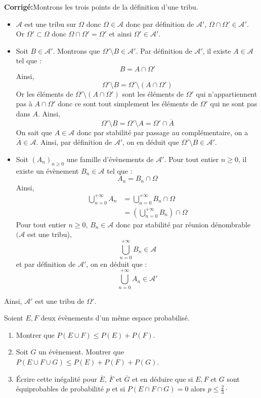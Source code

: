 \documentclass[a4paper,twoside,french,10pt]{VcCours}
\newcommand{\corr}{\textbf{Corrigé:}}
\begin{document}
\corr Montrons les trois points de la définition d'une tribu.

\begin{itemize}
\item $\mathcal{A}$ est une tribu sur $\Omega$ donc $\Omega \in \mathcal{A}$ donc par définition de $\mathcal{A}'$, $ \Omega \cap \Omega' \in \mathcal{A}'$. Or $\Omega' \subset \Omega$ donc $ \Omega \cap \Omega' = \Omega'$ et ainsi $\Omega' \in \mathcal{A}'$.
\item Soit $B \in \mathcal{A}'$. Montrons que $\Omega' \setminus B \in \mathcal{A}'$. Par définition de $\mathcal{A}'$, il existe $A \in \mathcal{A}$ tel que :
$$ B = A \cap \Omega'$$
Ainsi,
$$ \Omega' \setminus B  = \Omega' \setminus  (A \cap \Omega') $$
Or les éléments de $\Omega' \setminus  (A \cap \Omega')$ sont les éléments de $\Omega'$ qui n'appartiennent pas à $A \cap \Omega'$ donc ce sont tout simplement les éléments de $\Omega'$ qui ne sont pas dans $A$. Ainsi,
$$  \Omega' \setminus B = \Omega' \setminus A = \Omega' \cap \overline{A}$$
On sait que $A \in \mathcal{A}$ donc par stabilité par passage au complémentaire, on a $\overline{A} \in \mathcal{A}$. Ainsi, par définition de $\mathcal{A}'$, on en déduit que $\Omega' \setminus B \in \mathcal{A}'$.
\item Soit $(A_n)_{n \geq 0}$ une famille d'évènements de $\mathcal{A}'$. Pour tout entier $n \geq 0$, il existe un évènement $B_n \in \mathcal{A}$ tel que :
$$ A_n = B_n \cap \Omega$$
Ainsi,
\begin{align*}
\bigcup_{n=0}^{+ \infty} A_n & = \bigcup_{n=0}^{+ \infty}B_n \cap \Omega \\
& = \left( \bigcup_{n=0}^{+ \infty}B_n \right) \cap \Omega
\end{align*}
Pour tout entier $n \geq 0$, $B_n \in \mathcal{A}$ donc par stabilité par réunion dénombrable $(\mathcal{A}$ est une tribu),
$$  \bigcup_{n=0}^{+ \infty}B_n \in \mathcal{A}$$
et par définition de $\mathcal{A}'$, on en déduit que :
$$ \bigcup_{n=0}^{+ \infty} A_n \in \mathcal{A}'$$
\end{itemize}
Ainsi, $\mathcal{A}'$ est une tribu de $\Omega'$.

\begin{Exercice}{}  Soient $E,F$ deux évènements d'un même espace probabilisé.
\begin{enumerate}
\item Montrer que $P(E \cup F) \leq P(E) + P(F)$.
\item Soit $G$ un évènement. Montrer que $P(E \cup F \cup G) \leq P(E) + P(F) + P(G)$.
\item Écrire cette inégalité pour $\overline{E}$, $\overline{F}$ et $\overline{G}$ et en déduire que si $E,F$ et $G$ sont équiprobables de probabilité $p$ et si $P(E \cap F \cap G)=0$ alors $p \leq \frac{2}{3} \cdot$
\end{enumerate}
\end{Exercice}
\end{document}
